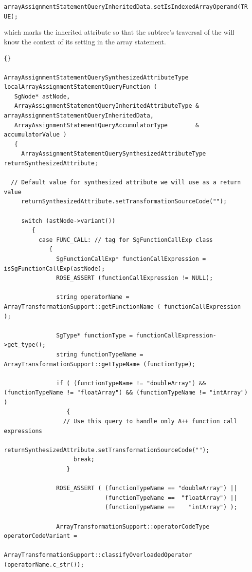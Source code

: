 \documentclass[10pt]{article}
\begin{document}
        {\tt arrayAssignmentStatementQueryInheritedData.setIsIndexedArrayOperand(TRUE); }

which marks the inherited attribute so that the subtree's traversal of the will know the context of its setting
in the array statement.

\vspace{0.5in}

\begin{lstlisting}{}

ArrayAssignmentStatementQuerySynthesizedAttributeType
localArrayAssignmentStatementQueryFunction (
   SgNode* astNode,
   ArrayAssignmentStatementQueryInheritedAttributeType & arrayAssignmentStatementQueryInheritedData, 
   ArrayAssignmentStatementQueryAccumulatorType        & accumulatorValue )
   {
     ArrayAssignmentStatementQuerySynthesizedAttributeType returnSynthesizedAttribute;

  // Default value for synthesized attribute we will use as a return value
     returnSynthesizedAttribute.setTransformationSourceCode("");

     switch (astNode->variant())
        {
          case FUNC_CALL: // tag for SgFunctionCallExp class
             {
               SgFunctionCallExp* functionCallExpression = isSgFunctionCallExp(astNode);
               ROSE_ASSERT (functionCallExpression != NULL);

               string operatorName = ArrayTransformationSupport::getFunctionName ( functionCallExpression );

               SgType* functionType = functionCallExpression->get_type();
               string functionTypeName = ArrayTransformationSupport::getTypeName (functionType);

               if ( (functionTypeName != "doubleArray") && (functionTypeName != "floatArray") && (functionTypeName != "intArray") )
                  {
                 // Use this query to handle only A++ function call expressions
                    returnSynthesizedAttribute.setTransformationSourceCode("");
                    break;
                  }

               ROSE_ASSERT ( (functionTypeName == "doubleArray") || 
                             (functionTypeName ==  "floatArray") ||
                             (functionTypeName ==    "intArray") );

               ArrayTransformationSupport::operatorCodeType operatorCodeVariant =
                    ArrayTransformationSupport::classifyOverloadedOperator (operatorName.c_str());


\end{lstlisting}
\end{document}
